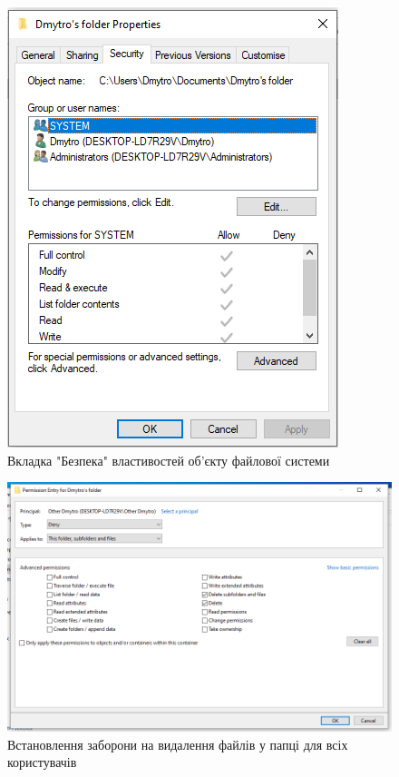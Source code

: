 \documentclass[oneside,14pt]{extarticle}
\begin{document}
\begin{normalsize}
	\begin{figure}[H]
		\centering
		\includegraphics[width=\columnwidth]{1}
		\caption{Вкладка "Безпека" властивостей об'єкту файлової системи}
	\end{figure}
	
	\begin{figure}[H]
		\centering
		\includegraphics[width=\columnwidth]{2}
		\caption{Встановлення заборони на видалення файлів у папці для всіх користувачів}
	\end{figure}
	

\end{normalsize}
\end{document}
